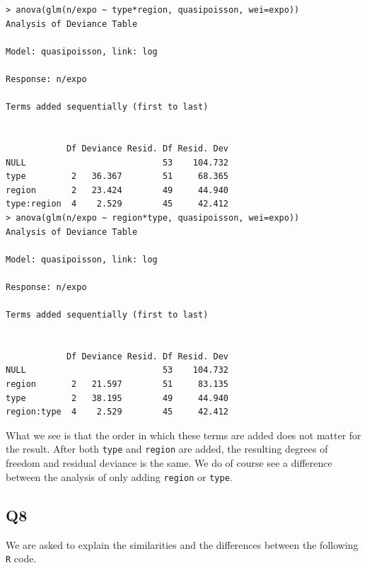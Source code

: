 \documentclass[11pt]{article}
\begin{document}
\begin{verbatim}
> anova(glm(n/expo ~ type*region, quasipoisson, wei=expo))
Analysis of Deviance Table

Model: quasipoisson, link: log

Response: n/expo

Terms added sequentially (first to last)


            Df Deviance Resid. Df Resid. Dev
NULL                           53    104.732
type         2   36.367        51     68.365
region       2   23.424        49     44.940
type:region  4    2.529        45     42.412
> anova(glm(n/expo ~ region*type, quasipoisson, wei=expo))
Analysis of Deviance Table

Model: quasipoisson, link: log

Response: n/expo

Terms added sequentially (first to last)


            Df Deviance Resid. Df Resid. Dev
NULL                           53    104.732
region       2   21.597        51     83.135
type         2   38.195        49     44.940
region:type  4    2.529        45     42.412
\end{verbatim}

What we see is that the order in which these terms are added does not matter for the result. After both \verb|type| and \verb|region| are added, the resulting degrees of freedom and residual deviance is the same. We do of course see a difference between the analysis of only adding \verb|region| or \verb|type|.

\subsection*{Q8}

We are asked to explain the similarities and the differences between the following \verb|R| code.
\end{document}
